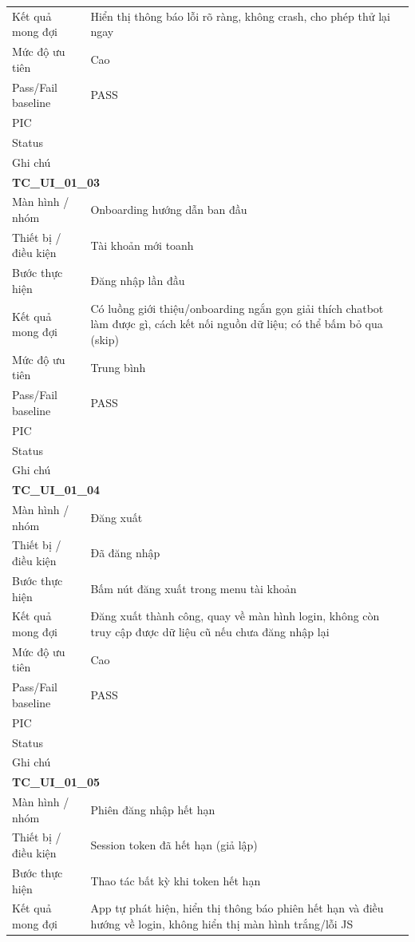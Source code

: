 \documentclass[12pt,a4paper]{article}
\begin{document}
\begin{longtable}{p{3.0cm}p{11.5cm}}
Kết quả mong đợi & Hiển thị thông báo lỗi rõ ràng, không crash, cho phép thử lại ngay \\
Mức độ ưu tiên & Cao \\
Pass/Fail baseline & PASS \\
PIC &  \\
Status &  \\
Ghi chú &  \\
\midrule
\multicolumn{2}{l}{\textbf{TC\_UI\_01\_03}} \\
Màn hình / nhóm & Onboarding hướng dẫn ban đầu \\
Thiết bị / điều kiện & Tài khoản mới toanh \\
Bước thực hiện & Đăng nhập lần đầu \\
Kết quả mong đợi & Có luồng giới thiệu/onboarding ngắn gọn giải thích chatbot làm được gì, cách kết nối nguồn dữ liệu; có thể bấm bỏ qua (skip) \\
Mức độ ưu tiên & Trung bình \\
Pass/Fail baseline & PASS \\
PIC &  \\
Status &  \\
Ghi chú &  \\
\midrule
\multicolumn{2}{l}{\textbf{TC\_UI\_01\_04}} \\
Màn hình / nhóm & Đăng xuất \\
Thiết bị / điều kiện & Đã đăng nhập \\
Bước thực hiện & Bấm nút đăng xuất trong menu tài khoản \\
Kết quả mong đợi & Đăng xuất thành công, quay về màn hình login, không còn truy cập được dữ liệu cũ nếu chưa đăng nhập lại \\
Mức độ ưu tiên & Cao \\
Pass/Fail baseline & PASS \\
PIC &  \\
Status &  \\
Ghi chú &  \\
\midrule
\multicolumn{2}{l}{\textbf{TC\_UI\_01\_05}} \\
Màn hình / nhóm & Phiên đăng nhập hết hạn \\
Thiết bị / điều kiện & Session token đã hết hạn (giả lập) \\
Bước thực hiện & Thao tác bất kỳ khi token hết hạn \\
Kết quả mong đợi & App tự phát hiện, hiển thị thông báo phiên hết hạn và điều hướng về login, không hiển thị màn hình trắng/lỗi JS \\

\end{longtable}
\end{document}
